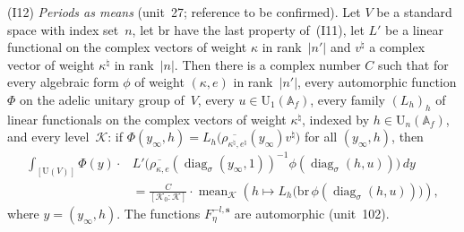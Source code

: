 \documentclass[11pt,a4paper]{article}
\newcommand{\m}[1]{\mbox{$#1$}}        %
\theoremstyle{plainx}
\theoremstyle{uprightx}
\newcommand{\Af}{\mathbb{A}_f}
\newcommand{\Un}{\mathrm{U}}
\newcommand{\cj}[1]{\overline{#1}}
\newcommand{\wrep}[2]{\rho_{#1,#2}}
\newcommand{\Fof}[3]{F^{#1,#2}_{#3}}
\newcommand{\clint}[2]{\operatorname{mean}_{#1}(#2)}
\newcommand{\Kmax}{\mathcal{K}_0}
\newcommand{\dg}[1]{\operatorname{diag}_{\sigma}(#1)}
\newcommand{\brm}{\mathrm{br}}                      %
\newcommand{\knat}{\kappa^{\natural}}
\newcommand{\enat}{e^{\natural}}
\begin{document}
{(I12) \emph{Periods as means} (unit~27; reference to be confirmed). Let $V$ be a standard space with index set~$n$,
let $\brm$ have the last property of~(I11), let $L'$ be a linear functional on the complex vectors of weight
$\kappa$ in rank~$|n'|$ and $v^{\natural}$ a complex vector of weight $\knat$ in rank~$|n|$. Then there is
a complex number $C$ such that for every algebraic form $\phi$ of weight $(\kappa,e)$ in rank~$|n'|$, every automorphic
function $\Phi$ on the adelic unitary group of~$V$, every $u\in\Un_1(\Af)$, every family $(L_h)_h$ of linear
functionals on the complex vectors of weight $\knat$, indexed by $h\in\Un_n(\Af)$, and every level~$\mathcal{K}$: if
\m{\Phi(y_\infty,h)=L_h\bigl(\cj{\wrep{\knat}{\enat}}(y_\infty)v^{\natural}\bigr)} for all
$(y_\infty,h)$, then
\[\begin{aligned}\int_{[\Un(V)]}\Phi(y)\cdot{}&L'\bigl(\cj{\wrep{\kappa}{e}}(\dg{y_\infty,1})^{-1}\phi(\dg{h,u})\bigr)\,dy\\
&=\frac{C}{[\Kmax:\mathcal{K}]}\cdot\clint{\mathcal{K}}{h\mapsto L_h\bigl(\brm\,\phi(\dg{h,u})\bigr)},\end{aligned}\]
where $y=(y_\infty,h)$. The functions $\Fof{-l}{\mathbf{s}}{\eta}$ are automorphic (unit~102).}
\end{document}

